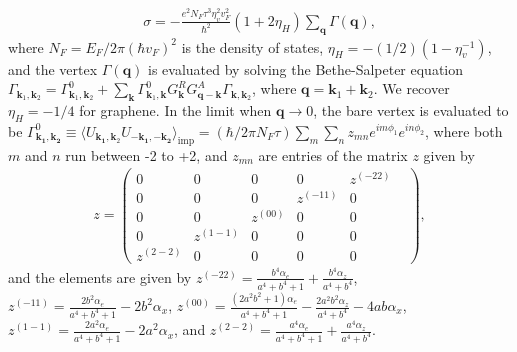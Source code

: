 \documentclass[aps,prb,amsmath,amssymb,footinbib,showpacs,twocolumn]{revtex4-2}
\begin{document}
\begin{align}
\sigma= -\frac{ e^{2}N_{F}\tau^{3}\eta^{2}_{v}v^{2}_{F}}{\hbar^{2}}(1+2\eta_{H})\sum_{\textbf{q}}\Gamma(\textbf{q}),
\label{Eq_conductivity}
\end{align}
where $N_F = {E_{F}}/{2\pi(\hbar v_{F})^2}$ is the density of states,  $\eta_{H}=-({1}/{2})\left(1-\eta^{-1}_{v}\right)$, and the vertex $\Gamma(\mathbf{q})$ is evaluated by solving the Bethe-Salpeter equation $ \Gamma_{\mathbf{k}_{1}, \mathbf{k}_{2}}= \Gamma_{\mathbf{k}_{1}, \mathbf{k}_{2}}^{0}+\sum_{\mathbf{k}}\Gamma_{\mathbf{k}_{1}, \mathbf{k}}^{0} G_{\mathbf{k}}^{R}G_{\mathbf{q}-\mathbf{k}}^{A} \Gamma_{\mathbf{k}, \mathbf{k}_{2}}$, where $\mathbf{q}=\mathbf{k}_1+\mathbf{k}_2$. We recover $\eta_H=-1/4$ for graphene. 
In the limit when $\mathbf{q}\rightarrow 0$, the bare vertex is evaluated to be $\Gamma^{0}_{\mathbf{k_{1},k_{2}}}\equiv \langle U_{\mathbf{k_1},\mathbf{k}_{2}}U_{\mathbf{-k_1},\mathbf{-k_2}}\bigl \rangle_{\mathrm{imp}} = ({\hbar}/{2\pi N_{F}\tau})\sum_{m}\sum_{n}z_{mn}e^{im\phi_{1}}e^{in\phi_{2}}$, where both $m$ and $n$ run between -2 to +2, and $z_{mn}$ are entries of the matrix $z$ given by~\cite{SI} 
\begin{align}
     z= 
    \begin{pmatrix}
    0 & 0 & 0 & 0 & z^{(-22)}\\
     0 & 0 & 0 & z^{(-11)} & 0 \\
      0 & 0 & z^{(00)} & 0 & 0 \\
      0 & z^{(1-1)} & 0 & 0 & 0 \\
      z^{(2-2)} & 0 & 0 & 0 & 0 &
    \end{pmatrix},
\end{align}
and the elements are given by $ z^{(-22)} = \frac{b^4 \alpha _e}{a^4+b^4+1}+\frac{b^4 \alpha _z}{a^4+b^4}$, $
z^{(-11)} = \frac{2 b^2 \alpha _e}{a^4+b^4+1}-2 b^2 \alpha _x $, $z^{(00)} = \frac{\left(2 a^2 b^2+1\right) \alpha _e}{a^4+b^4+1}-\frac{2 a^2 b^2 \alpha _z}{a^4+b^4}-4 a b \alpha _x $, $z^{(1-1)} = \frac{2 a^2 \alpha _e}{a^4+b^4+1}-2 a^2 \alpha _x $, and $z^{(2-2)} = \frac{a^4 \alpha _e}{a^4+b^4+1}+\frac{a^4 \alpha _z}{a^4+b^4}$. 
\end{document}
